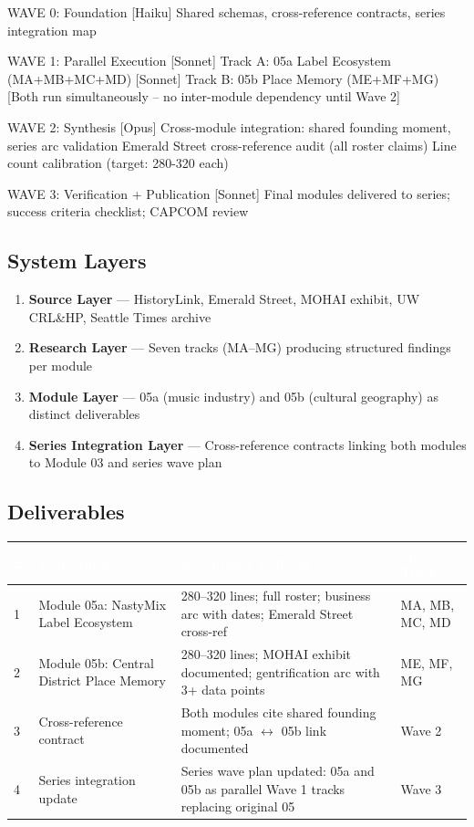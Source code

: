 \documentclass[11pt,letterpaper]{article}
\newcommand{\tableheader}[1]{\textbf{\sffamily\textcolor{white}{#1}}}
\begin{document}
\begin{asciibox}
WAVE 0: Foundation
  [Haiku] Shared schemas, cross-reference contracts, series integration map

WAVE 1: Parallel Execution
  [Sonnet] Track A: 05a Label Ecosystem (MA+MB+MC+MD)
  [Sonnet] Track B: 05b Place Memory (ME+MF+MG)
  [Both run simultaneously -- no inter-module dependency until Wave 2]

WAVE 2: Synthesis
  [Opus] Cross-module integration: shared founding moment, series arc validation
         Emerald Street cross-reference audit (all roster claims)
         Line count calibration (target: 280-320 each)

WAVE 3: Verification + Publication
  [Sonnet] Final modules delivered to series; success criteria checklist; CAPCOM review
\end{asciibox}

\subsection{System Layers}

\begin{enumerate}
\item \textbf{Source Layer} --- HistoryLink, Emerald Street, MOHAI exhibit, UW CRL\&HP, Seattle Times archive
\item \textbf{Research Layer} --- Seven tracks (MA--MG) producing structured findings per module
\item \textbf{Module Layer} --- 05a (music industry) and 05b (cultural geography) as distinct deliverables
\item \textbf{Series Integration Layer} --- Cross-reference contracts linking both modules to Module 03 and series wave plan
\end{enumerate}

\subsection{Deliverables}

\begin{center}
\begin{tabularx}{\textwidth}{C{0.5cm}L{4cm}XL{3cm}}
\toprule
{}
\tableheader{\#} & \tableheader{Deliverable} & \tableheader{Acceptance Criteria} & \tableheader{Spec Track} \\
 & Module 05a: NastyMix Label Ecosystem & 280--320 lines; full roster; business arc with dates; Emerald Street cross-ref & MA, MB, MC, MD \\
2 & Module 05b: Central District Place Memory & 280--320 lines; MOHAI exhibit documented; gentrification arc with 3+ data points & ME, MF, MG \\
3 & Cross-reference contract & Both modules cite shared founding moment; 05a $\leftrightarrow$ 05b link documented & Wave 2 \\
4 & Series integration update & Series wave plan updated: 05a and 05b as parallel Wave 1 tracks replacing original 05 & Wave 3 \\
\bottomrule
\end{tabularx}
\end{center}
\end{document}
